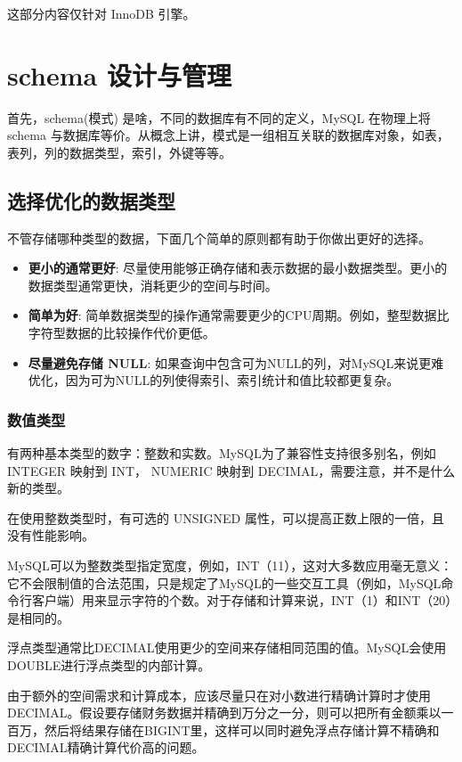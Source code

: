 这部分内容仅针对 InnoDB 引擎。

\section{schema 设计与管理}

首先，schema(模式) 是啥，不同的数据库有不同的定义，MySQL 在物理上将 schema 与数据库等价。从概念上讲，模式是一组相互关联的数据库对象，如表，表列，列的数据类型，索引，外键等等。

\subsection{选择优化的数据类型}

不管存储哪种类型的数据，下面几个简单的原则都有助于你做出更好的选择。

\begin{itemize}
    \item \textbf{更小的通常更好}: 尽量使用能够正确存储和表示数据的最小数据类型。更小的数据类型通常更快，消耗更少的空间与时间。
    \item \textbf{简单为好}: 简单数据类型的操作通常需要更少的CPU周期。例如，整型数据比字符型数据的比较操作代价更低。
    \item \textbf{尽量避免存储 NULL}: 如果查询中包含可为NULL的列，对MySQL来说更难优化，因为可为NULL的列使得索引、索引统计和值比较都更复杂。
\end{itemize}

\subsubsection{数值类型}

有两种基本类型的数字：整数和实数。MySQL为了兼容性支持很多别名，例如 INTEGER 映射到 INT， NUMERIC 映射到 DECIMAL，需要注意，并不是什么新的类型。

在使用整数类型时，有可选的 UNSIGNED 属性，可以提高正数上限的一倍，且没有性能影响。

MySQL可以为整数类型指定宽度，例如，INT（11），这对大多数应用毫无意义：它不会限制值的合法范围，只是规定了MySQL的一些交互工具（例如，MySQL命令行客户端）用来显示字符的个数。对于存储和计算来说，INT（1）和INT（20）是相同的。

浮点类型通常比DECIMAL使用更少的空间来存储相同范围的值。MySQL会使用DOUBLE进行浮点类型的内部计算。

由于额外的空间需求和计算成本，应该尽量只在对小数进行精确计算时才使用DECIMAL。假设要存储财务数据并精确到万分之一分，则可以把所有金额乘以一百万，然后将结果存储在BIGINT里，这样可以同时避免浮点存储计算不精确和DECIMAL精确计算代价高的问题。

